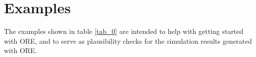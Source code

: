 \documentclass[12pt, a4paper]{article}
\begin{document}
%
%
%
%
%
%
%
%
%
%
%
%
%

\section{Examples}\label{sec:examples}

The examples shown in table \ref{tab_0} are intended to help with getting started with ORE, and to serve as plausibility
checks for the simulation results generated with ORE.
\end{document}
